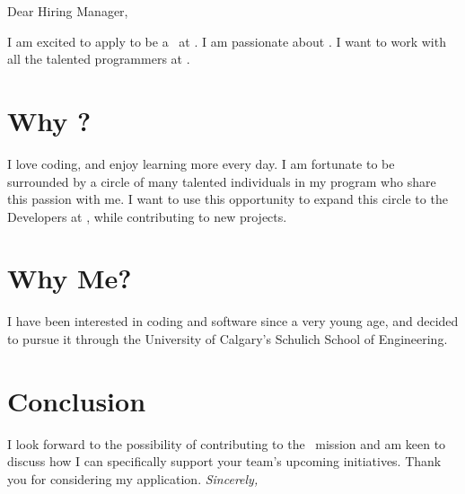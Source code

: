 \vspace{8pt}

\noindent{}\Large{Dear Hiring Manager,}

\par{}

I am excited to apply to be a \jobTitle~at \companyName. I am passionate about \introTopics. I want to work with all the talented programmers at \companyName.

\section{Why \companyName?}
I love coding, and enjoy learning more every day. I am fortunate to be surrounded by a circle of many talented individuals in my program who share this passion with me. I want to use this opportunity to expand this circle to the Developers at \companyName, while contributing to new projects.

\section{Why Me?}
I have been interested in coding and software since a very young age, and decided to pursue it through the University of Calgary’s Schulich School of Engineering. \whyMePersonalized{}
\section{Conclusion}

I look forward to the possibility of contributing to the \companyName~mission and am keen to discuss how I can specifically support your team's upcoming initiatives. Thank you for considering my application.
\newline
\newline
\Large{
	\textit{Sincerely,}\\
	\userFullName
}

